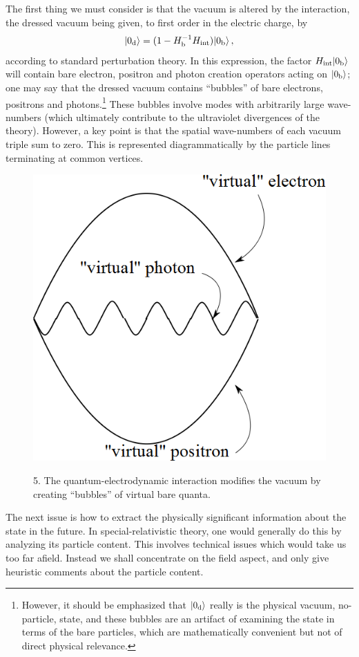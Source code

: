 \documentclass[
%
draft    %
,numberedheadings 
,bibliocites
  ]
  {aipproc}
\begin{document}
The first thing we must consider is that the vacuum is altered by the interaction, the dressed vacuum being given, to first order in the electric charge, by
\begin{equation}
 |0_{\rm d}\rangle =(1-H_{\rm b}^{-1}H_{\rm int})|0_{\rm b}\rangle\, ,
\end{equation}
according to standard perturbation theory.  In this expression, the factor $H_{\rm int}|0_{\rm b}\rangle$ will contain bare electron, positron and photon creation operators acting on $|0_{\rm b}\rangle$; one may say that the dressed vacuum contains ``bubbles'' of bare electrons, positrons and photons.\footnote{
However, it should be emphasized that $|0_{\rm d}\rangle$ really is the physical vacuum, no-particle, state, and these bubbles are an artifact of examining the state in terms of the bare particles, which are mathematically convenient but not of direct physical relevance.}
These bubbles involve modes with arbitrarily large wave-numbers (which ultimately contribute to the ultraviolet divergences of the theory).  However, a key point is that the spatial wave-numbers of each vacuum triple sum to zero.  
This is represented diagrammatically by the particle lines terminating at common vertices.

\begin{figure}
  \begin{flushright}
{\includegraphics[width=.3\textwidth]{VacuumBubble.png}}
\makebox[.3\textwidth]{$\ $ }
\parbox{.3\textwidth}{5. The quantum-electrodynamic interaction modifies the vacuum by creating ``bubbles'' of virtual bare quanta.}
\end{flushright}
\label{fig:vacbubble}
\end{figure}

The next issue is how to extract the physically significant information about the state in the future.  In special-relativistic theory, one would generally do this by analyzing its particle content.  This involves technical issues which would take us too far afield.  Instead we shall concentrate on the field aspect, and only give heuristic comments about the particle content.
\end{document}
